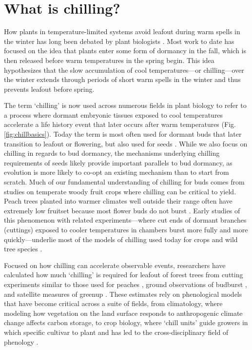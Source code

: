 \documentclass[11pt]{article}
\begin{document}
\section*{What is chilling?}
How plants in temperature-limited systems avoid leafout during warm spells in the winter has long been debated by plant biologists \citep[e.g.,][]{lamb1948effect,weinberger}. Most work to date has focused on the idea that plants enter some form of dormancy in the fall, which is then released before warm temperatures in the spring begin. This idea hypothesizes that the slow accumulation of cool temperatures---or chilling---over the winter extends through periods of short warm spells in the winter and thus prevents leafout before spring. 

The term `chilling' is now used across numerous fields in plant biology to refer to a process where dormant embryonic tissues exposed to cool temperatures accelerate a life history event that later occurs after warm temperatures (Fig. \ref{fig:chillbasics}). Today the term is most often used for dormant buds that later transition to leafout or flowering, but also used for seeds \citep[though `cold stratification,' which indicates an additional requirement of moist conditions, is more often used for seeds,][]{baskin2000seeds,considine2016language}. While we also focus on chilling in regards to bud dormancy, the mechanisms underlying chilling requirements of seeds likely provide important parallels to bud dormancy, as evolution is more likely to co-opt an existing mechanism than to start from scratch.  
Much of our fundamental understanding of chilling for buds comes from studies on temperate woody fruit crops where chilling can be critical to yield. Peach trees planted into warmer climates well outside their range often have extremely low fruitset because most flower buds do not burst \citep{weinberger,overcash1955effects,erez1971improved}. Early studies of this phenomenon with related experiments---where cut ends of dormant branches (cuttings) exposed to cooler temperatures in chambers burst more fully and more quickly---underlie most of the models of chilling used today for crops and wild tree species \citep[][]{weinberger,ospreebbms}. 

Focused on how chilling can accelerate observable events, researchers have calculated how much `chilling' is required for leafout of forest trees from cutting experiments similar to those used for peaches \citep[reviewed in][]{ospreebbms}, ground observations of budburst \citep{Luedeling2009}, and satellite measures of greenup \citep{kaduk2011predicting}. These estimates rely on phenological models that have become critical across a suite of fields, from climatology, where modeling how vegetation on the land surface responds to anthropogenic climate change affects carbon storage, to crop biology, where `chill units'  guide growers in which specific cultivar to plant and has led to the cross-disciplinary field of phenology \citep{Schwartz:1994he,Cleland:2007or,pmp}. 
\end{document}
